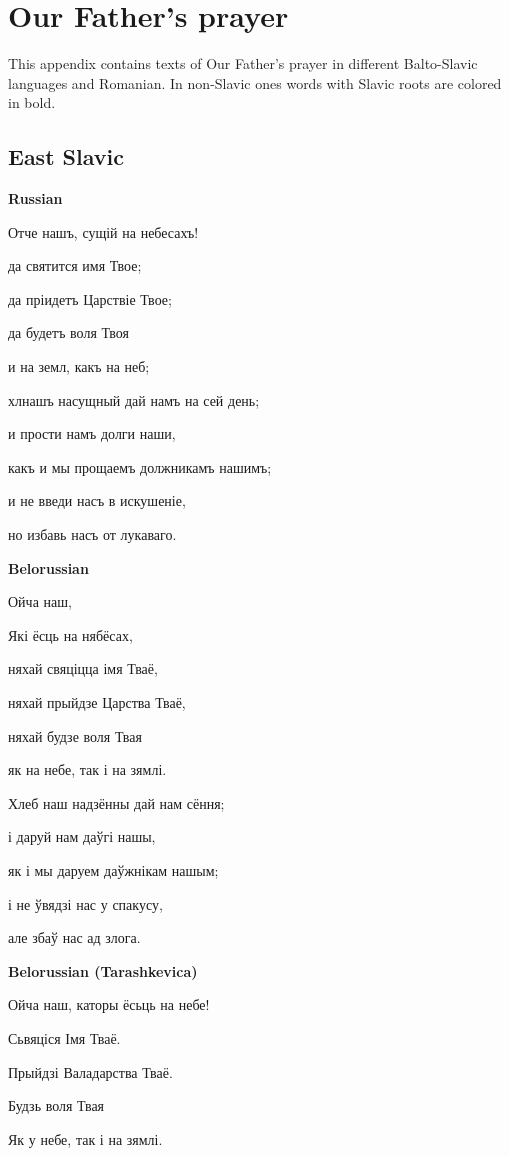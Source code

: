 \section{Our Father's prayer}

This appendix contains texts of Our Father's prayer in different Balto-Slavic languages and Romanian. In non-Slavic ones words with Slavic roots are colored in bold.

\subsection{East Slavic}

\textbf{Russian}

Отче нашъ, сущій на небесахъ!

да святится имя Твое;

да пріидетъ Царствіе Твое;

да будетъ воля Твоя

и на земл\cyryat, какъ на неб\cyryat;

хл нашъ насущный дай намъ на сей день;

и прости намъ долги наши,

какъ и мы прощаемъ должникамъ нашимъ;

и не введи насъ в искушеніе,

но избавь насъ от лукаваго.

\textbf{Belorussian}

Ойча наш,

Які ёсць на нябёсах,

няхай свяціцца імя Тваё,

няхай прыйдзе Царства Тваё,

няхай будзе воля Твая

як на небе, так і на зямлі.

Хлеб наш надзённы дай нам сёння;

і даруй нам даўгі нашы,

як і мы даруем даўжнікам нашым;

і не ўвядзі нас у спакусу,

але збаў нас ад злога. 

\textbf{Belorussian (Tarashkevica)}

Ойча наш, каторы ёсьць на небе! 

Сьвяціся Імя Тваё. 

Прыйдзі Валадарства Тваё. 

Будзь воля Твая 

Як у небе, так і на зямлі. 

